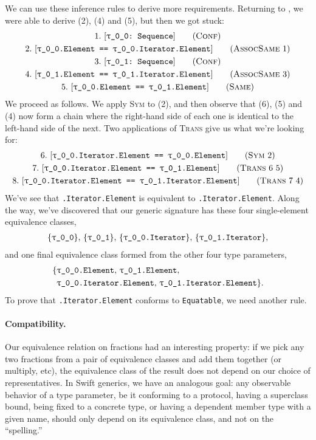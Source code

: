 \documentclass[../generics]{subfiles}
\begin{document}
\begin{example}\label{derived equiv example}
We can use these inference rules to derive more requirements. Returning to , we were able to derive (2), (4) and (5), but then we got stuck:
\begin{gather*}
\ConfStep{\rT}{Sequence}{1}\\
\AssocSameStep{1}{\rT.Element}{\rT.Iterator.Element}{2}\\
\ConfStep{\rU}{Sequence}{3}\\
\AssocSameStep{3}{\rU.Element}{\rU.Iterator.Element}{4}\\
\SameStep{\rT.Element}{\rU.Element}{5}
\end{gather*}
We proceed as follows. We apply \textsc{Sym} to (2), and then observe that (6), (5) and (4) now form a chain where the right-hand side of each one is identical to the left-hand side of the next. Two applications of \textsc{Trans} give us what we're looking for:
\begin{gather*}
\SymStep{2}{\rT.Iterator.Element}{\rT.Element}{6}\\
\TransStep{6}{5}{\rT.Iterator.Element}{\rU.Element}{7}\\
\TransStep{7}{4}{\rT.Iterator.Element}{\rU.Iterator.Element}{8}
\end{gather*}
We've see that \texttt{\rT.Iterator.Element} is equivalent to \texttt{\rU.Iterator.Element}. Along the way, we've discovered that our generic signature has these four single-element equivalence classes,
\begin{gather*}
\{\texttt{\rT}\},\,
\{\texttt{\rU}\},\,
\{\texttt{\rT.Iterator}\},\,
\{\texttt{\rU.Iterator}\},
\end{gather*}
and one final equivalence class formed from the other four type parameters,
\begin{align*}
\{&\texttt{\rT.Element},\,\texttt{\rU.Element},\,\\
&\texttt{\rT.Iterator.Element},\,\texttt{\rU.Iterator.Element}\}.
\end{align*}
To prove that \texttt{\rT.Iterator.Element} conforms to \texttt{Equatable}, we need another rule.
\end{example}

\paragraph{Compatibility.}
Our equivalence relation on fractions had an interesting property: if we pick any two fractions from a pair of equivalence classes and add them together (or multiply, etc), the equivalence class of the result does not depend on our choice of representatives. In Swift generics, we have an analogous goal: any observable behavior of a type parameter, be it conforming to a protocol, having a superclass bound, being fixed to a concrete type, or having a dependent member type with a given name, should only depend on its equivalence class, and not on the ``spelling.''
\end{document}
